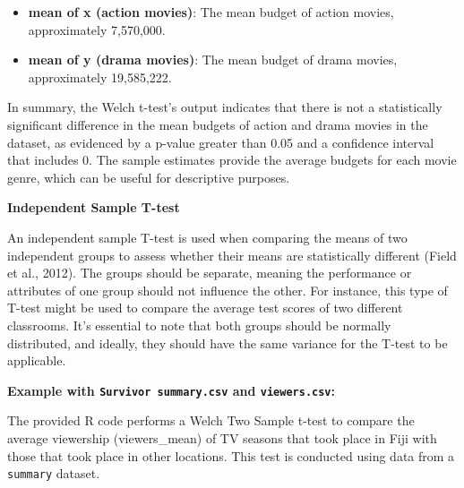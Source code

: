 \documentclass[
]{book}
\newenvironment{Shaded}{\begin{snugshade}}{\end{snugshade}}
\newcommand{\CommentTok}[1]{\textcolor[rgb]{0.56,0.35,0.01}{\textit{#1}}}
\newcommand{\FunctionTok}[1]{\textcolor[rgb]{0.13,0.29,0.53}{\textbf{#1}}}
\newcommand{\NormalTok}[1]{#1}
\newcommand{\OtherTok}[1]{\textcolor[rgb]{0.56,0.35,0.01}{#1}}
\newcommand{\SpecialCharTok}[1]{\textcolor[rgb]{0.81,0.36,0.00}{\textbf{#1}}}
\newcommand{\StringTok}[1]{\textcolor[rgb]{0.31,0.60,0.02}{#1}}
\providecommand{\tightlist}{%
  \setlength{\itemsep}{0pt}\setlength{\parskip}{0pt}}
\begin{document}
\begin{enumerate}
  \begin{itemize}
  \tightlist
  \item
    \textbf{mean of x (action movies)}: The mean budget of action movies, approximately 7,570,000.
  \item
    \textbf{mean of y (drama movies)}: The mean budget of drama movies, approximately 19,585,222.
  \end{itemize}
\end{enumerate}

In summary, the Welch t-test's output indicates that there is not a statistically significant difference in the mean budgets of action and drama movies in the dataset, as evidenced by a p-value greater than 0.05 and a confidence interval that includes 0. The sample estimates provide the average budgets for each movie genre, which can be useful for descriptive purposes.

\textbf{Independent Sample T-test}

An independent sample T-test is used when comparing the means of two independent groups to assess whether their means are statistically different (Field et al., 2012). The groups should be separate, meaning the performance or attributes of one group should not influence the other. For instance, this type of T-test might be used to compare the average test scores of two different classrooms. It's essential to note that both groups should be normally distributed, and ideally, they should have the same variance for the T-test to be applicable.

\textbf{Example with \texttt{Survivor\ summary.csv} and \texttt{viewers.csv}:}

The provided R code performs a Welch Two Sample t-test to compare the average viewership (viewers\_mean) of TV seasons that took place in Fiji with those that took place in other locations. This test is conducted using data from a \texttt{summary} dataset.

\begin{Shaded}
\end{Shaded}
\end{document}
